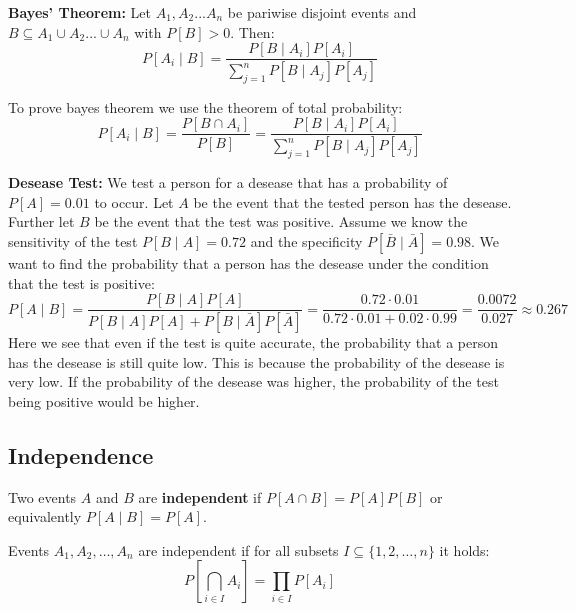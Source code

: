 \begin{theorem}

\textbf{Bayes' Theorem: }
    Let $A_1, A_2 ... A_n$ be pariwise disjoint events and $B \subseteq A_1 \cup A_2 ... \cup A_n$ with
    $P[B] > 0$. Then:
    $$P[A_i \mid B] = \frac{P[B \mid A_i] P[A_i]}{\sum_{j=1}^n P[B \mid
    A_j] P[A_j]}$$
    
\end{theorem}

    To prove bayes theorem we use the theorem of total probability:
    $$P[A_i \mid B] = \frac{P[B \cap A_i]}{P[B]} = \frac{P[B \mid A_i] P[A_i]}{\sum_{j=1}^n P[B \mid
    A_j] P[A_j]}$$

    \begin{example}

\textbf{Desease Test: }We test a person for a desease that has a probability of $P[A] = 0.01$ to occur.
    Let $A$ be the event that the tested person has the desease. Further let $B$ be the event that the test
    was positive. Assume we know the sensitivity of the test $P[B \mid A] = 0.72$ and the specificity
    $P[\bar{B} \mid \bar{A}] = 0.98$. We want to find the probability that a person has the desease under
    the condition that the test is positive:
    $$P[A \mid B] = \frac{P[B \mid A] P[A]}{P[B \mid A] P[A] + P[B \mid
    \bar{A}] P[\bar{A}]} = \frac{0.72 \cdot 0.01}{0.72 \cdot 0.01 + 0.02 \cdot 0.99} = \frac{0.0072}{0.027}
    \approx 0.267$$
    Here we see that even if the test is quite accurate, the probability that a person has the desease
    is still quite low. This is because the probability of the desease is very low. If the probability of
    the desease was higher, the probability of the test being positive would be higher.
    
\end{example}

\subsection{Independence}

\begin{definition}

    Two events $A$ and $B$ are \textbf{independent} if $P[A \cap B] = P[A] P[B]$ or equivalently $P[A \mid B]
    = P[A]$.
    
\end{definition}

\begin{definition}

    Events $A_1, A_2, \dots, A_n$ are independent if for all subsets $I \subseteq \{1, 2, \dots, n\}$ it
    holds:
    $$P[\bigcap_{i \in I} A_i] = \prod_{i \in I} P[A_i]$$
    
\end{definition}


